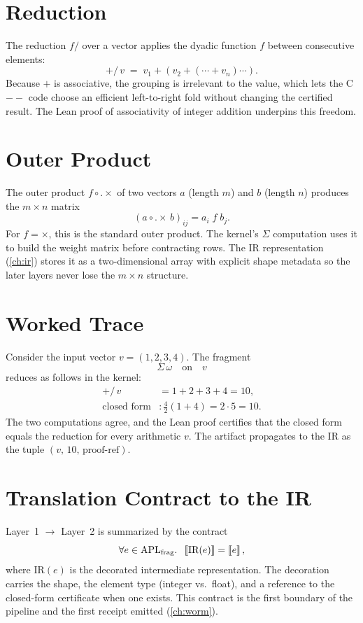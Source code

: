 \section{Reduction}
\label{sec:apl-red}

The reduction $f/$ over a vector applies the dyadic function $f$
between consecutive elements:
\[
+/\, v \;=\; v_1 + (v_2 + (\cdots + v_n)\cdots).
\]
Because $+$ is associative, the grouping is irrelevant to the value, which
lets the C$--$ code choose an efficient left-to-right fold without
changing the certified result. The Lean proof of associativity of integer
addition underpins this freedom.

\section{Outer Product}
\label{sec:apl-outer}

The outer product $f\circ.\times$ of two vectors $a$ (length $m$) and
$b$ (length $n$) produces the $m\times n$ matrix
\[
(a\circ.\times\, b)_{ij} = a_i\; f\; b_j.
\]
For $f = \times$, this is the standard outer product. The kernel's
$\Sigma$ computation uses it to build the weight matrix before
contracting rows. The IR representation (\cref{ch:ir}) stores it as a
two-dimensional array with explicit shape metadata so the later layers
never lose the $m\times n$ structure.

\section{Worked Trace}
\label{sec:apl-trace}

Consider the input vector $v = (1,2,3,4)$. The fragment
\[
\Sigma\,\omega \quad\text{on}\quad v
\]
reduces as follows in the kernel:
\begin{align*}
+/\, v &= 1+2+3+4 = 10,\\
\text{closed form} &: \frac{4}{2}(1+4) = 2\cdot 5 = 10.
\end{align*}
The two computations agree, and the Lean proof certifies that the closed
form equals the reduction for every arithmetic $v$. The artifact
propagates to the IR as the tuple $(v,\, 10,\,\text{proof-ref})$.

\section{Translation Contract to the IR}
\label{sec:apl-contract}

Layer~1 $\to$ Layer~2 is summarized by the contract
\[
\forall e\in\text{APL}_{\text{frag}}.\;\;
\left\llbracket \text{IR}(e) \right\rrbracket = \left\llbracket e \right\rrbracket,
\]
where $\text{IR}(e)$ is the decorated intermediate representation. The
decoration carries the shape, the element type (integer vs.\ float), and a
reference to the closed-form certificate when one exists. This contract is
the first boundary of the pipeline and the first receipt emitted
(\cref{ch:worm}).
